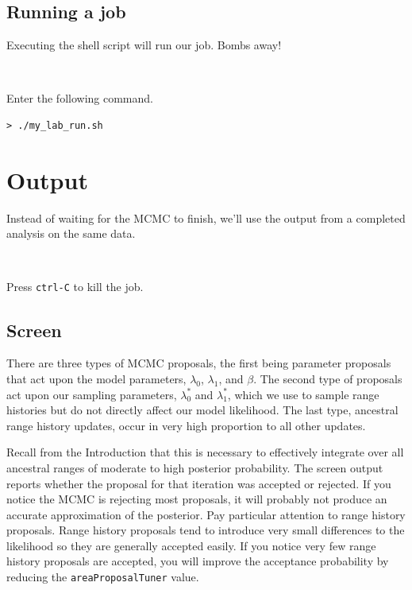 \documentclass[11pt]{article}
\newcommand{\impmark}{\strut\vadjust{\domark}}
\newcommand{\domark}{%
  \vbox to 0pt{
    \kern-\dp\strutbox
    \smash{\llap{$\rightarrow$\kern1em}}
    \vss
  }%
}
\begin{document}
\subsection{Running a job}

Executing the shell script will run our job. Bombs away!

\noindent \\ \impmark Enter the following command.
\begin{framed}
\begin{lstlisting}
> ./my_lab_run.sh
\end{lstlisting}
\end{framed}

\section{Output}

Instead of waiting for the MCMC to finish, we'll use the output from a completed analysis on the same data.

\noindent \\ \impmark Press \texttt{ctrl-C} to kill the job.

\subsection{Screen}

There are three types of MCMC proposals, the first being parameter proposals that act upon the model parameters, $\lambda_0$, $\lambda_1$, and $\beta$.
The second type of proposals act upon our sampling parameters, $\lambda^*_0$ and $\lambda^*_1$, which we use to sample range histories but do not directly affect our model likelihood.
The last type, ancestral range history updates, occur in very high proportion to all other updates.

Recall from the Introduction that this is necessary to effectively integrate over all ancestral ranges of moderate to high posterior probability.
The screen output reports whether the proposal for that iteration was accepted or rejected.
If you notice the MCMC is rejecting most proposals, it will probably not produce an accurate approximation of the posterior.
Pay particular attention to range history proposals.
Range history proposals tend to introduce very small differences to the likelihood so they are generally accepted easily.
If you notice very few range history proposals are accepted, you will improve the acceptance probability by reducing the \texttt{areaProposalTuner} value.
\end{document}
